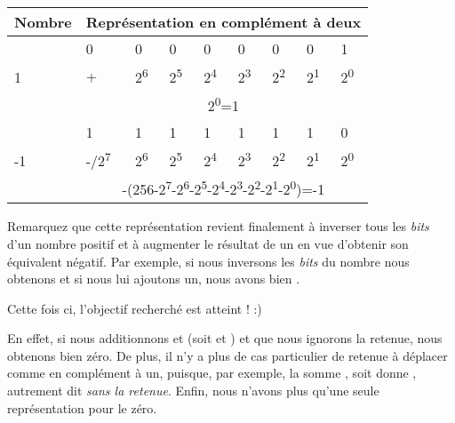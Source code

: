 \begin{table}
\centering
\begin{tabular}{|l|l|l|l|l|l|l|l|l|}\hline
\rowcolor{gris-tab-entete}\bf Nombre& \multicolumn{8}{l|}{\bf Représentation en complément à deux}\\
 \hline
  \multirow{3}{2cm}{1} & 0 & 0 & 0 & 0 & 0 & 0 & 0 & 1 \\ 
  \cline{2-9}
    &+&2\textsuperscript{6}&2\textsuperscript{5}&2\textsuperscript{4}&2\textsuperscript{3}&2\textsuperscript{2}&2\textsuperscript{1}&2\textsuperscript{0}\\ 
  \cline{2-9}
    &\multicolumn{8}{c|}{2\textsuperscript{0}=1}\\ 
  \hline
  \multirow{3}{2cm}{-1} & 1 & 1 & 1 & 1 & 1 & 1 & 1 & 0 \\ 
  \cline{2-9}
    &-/2\textsuperscript{7}&2\textsuperscript{6}&2\textsuperscript{5}&2\textsuperscript{4}&2\textsuperscript{3}&2\textsuperscript{2}&2\textsuperscript{1}&2\textsuperscript{0}\\ 
  \cline{2-9}
    &\multicolumn{8}{c|}{-(256-2\textsuperscript{7}-2\textsuperscript{6}-2\textsuperscript{5}-2\textsuperscript{4}-2\textsuperscript{3}-2\textsuperscript{2}-2\textsuperscript{1}-2\textsuperscript{0})=-1}\\ 
  \hline
\end{tabular}
\end{table}

\begin{infobox}
  Remarquez que cette représentation
revient finalement à inverser tous les \emph{bits} d'un nombre positif
et à augmenter le résultat de un en vue d'obtenir son équivalent
négatif. Par exemple, si nous inversons les \emph{bits} du nombre
 nous obtenons  et si nous lui ajoutons un,
nous avons bien .
\end{infobox}


Cette fois ci, l'objectif recherché est atteint ! :)

En effet, si nous additionnons  et  (soit
 et ) et que nous ignorons la
retenue, nous obtenons bien zéro. De plus, il n'y a plus de cas
particulier de retenue à déplacer comme en complément à un, puisque, par
exemple, la somme , soit
 donne ,
autrement dit  \emph{sans la retenue}. Enfin, nous n'avons
plus qu'une seule représentation pour le zéro.

